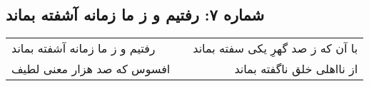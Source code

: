 \begin{center}
\section*{شماره ۷: رفتیم و ز ما زمانه آشفته بماند}
\label{sec:007}
\begin{longtable}{l p{0.5cm} r}
رفتیم و ز ما زمانه آشفته بماند
&&
با آن که ز صد گهرِ یکی سفته بماند
\\
افسوس که صد هزار معنی لطیف
&&
از نااهلی خلق ناگفته بماند
\\
\end{longtable}
\end{center}
